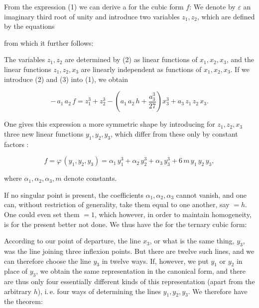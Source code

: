 From the expression (1) we can derive a 
 for the cubic form $f$:
We denote by $\varepsilon$ an imaginary third root of unity
and introduce two variables $z_1, z_2$, which are defined by the equations


from which it further follows:


The variables $z_1, z_2$ are determined by (2) as linear functions
of $x_1, x_2, x_3$, and the linear functions $z_1, z_2, x_3$
are linearly independent as functions of $x_1, x_2, x_3$. If we
introduce (2) and (3) into (1), we obtain

\[
-\,a_1\,a_2\,f = z_1^3 + z_2^3 - \left(a_1\,a_2\,h + \frac{a_3^3}{27}\right)x_3^3 + a_3\,z_1\,z_2\,x_3.
\]

One gives this expression a more symmetric shape
 by introducing for $z_1, z_2, x_3$ three new linear functions
$y_1, y_2, y_3$, which differ from these only by constant factors
:

\[
f = \varphi\,(y_1,y_2,y_3) = \alpha_1\,y_1^3 + \alpha_2\,y_2^3 + \alpha_3\,y_3^3 + 6\,m\,y_1\,y_2\,y_3,
\]

where $\alpha_1, \alpha_2, \alpha_3, m$ denote constants.

If no singular point is present, the
coefficients $\alpha_1, \alpha_2, \alpha_3$ cannot vanish, and one can,
without restriction of generality, take them equal to one another, say $=h$.
One could even set them $=1$, which however, in order to
maintain homogeneity, is for the present better not done.
We thus have the  for the ternary
cubic form:


According to our point of departure, the line $x_3$, or what
is the same thing, $y_3$, was the line joining three inflexion points.
But there are twelve such lines, and we can therefore choose the
line $y_3$ in twelve ways. If, however, we put $y_1$ or $y_2$ in
place of $y_3$, we obtain the same representation in the
canonical form, and there are thus only four essentially different
 kinds of this representation (apart from the arbitrary
 $h$), i.\,e. four ways of determining the lines $y_1, y_2, y_3$. We
therefore have the theorem:
